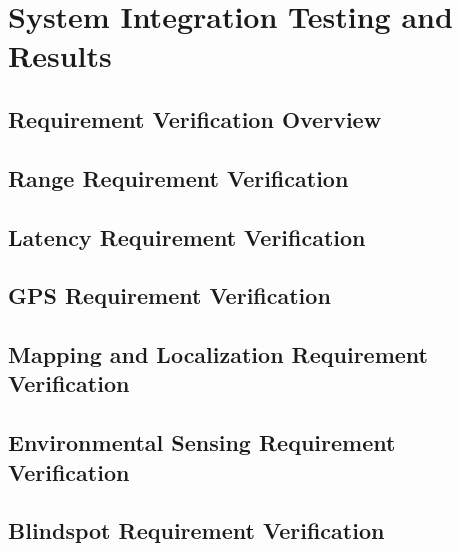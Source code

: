 \chapter{System Integration Testing and Results}

\section{Requirement Verification Overview}

\section{Range Requirement Verification}

\section{Latency Requirement Verification}

\section{GPS Requirement Verification}
\section{Mapping and Localization Requirement Verification}
\section{Environmental Sensing Requirement Verification}

\section{Blindspot Requirement Verification}
